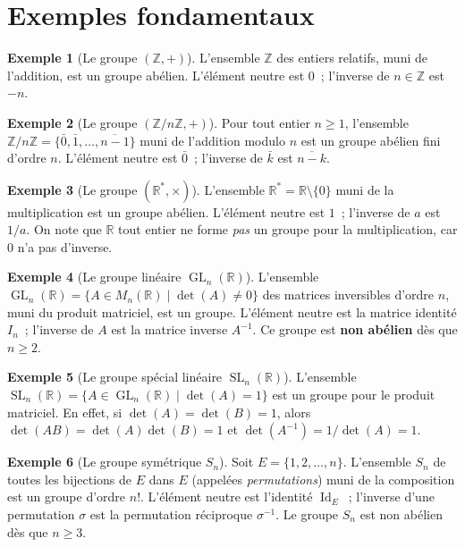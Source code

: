 \documentclass[12pt,a4paper,openany]{book}
\theoremstyle{definition}
\newtheorem{exemple}{Exemple}[chapter]
\newcommand{\Z}{\mathbb{Z}}
\newcommand{\R}{\mathbb{R}}
\DeclareMathOperator{\Id}{Id}
\DeclareMathOperator{\GL}{GL}
\DeclareMathOperator{\SL}{SL}
\begin{document}
\section{Exemples fondamentaux}
\label{sec:ch1-exemples}

\begin{exemple}[Le groupe $(\Z, +)$]
\label{ex:Z-additif}
\index{Z@$\Z$}
L'ensemble $\Z$ des entiers relatifs, muni de l'addition, est un groupe abélien.
L'élément neutre est $0$~; l'inverse de $n \in \Z$ est $-n$.
\end{exemple}

\begin{exemple}[Le groupe $(\Z/n\Z, +)$]
\label{ex:ZnZ-additif}
\index{Z/nZ@$\Z/n\Z$}
Pour tout entier $n \geq 1$, l'ensemble $\Z/n\Z = \{\bar{0}, \bar{1}, \ldots,
\overline{n-1}\}$ muni de l'addition modulo $n$ est un groupe abélien fini d'ordre $n$.
L'élément neutre est $\bar{0}$~; l'inverse de $\bar{k}$ est $\overline{n-k}$.
\end{exemple}

\begin{exemple}[Le groupe $(\R^*, \times)$]
\label{ex:R-etoile}
\index{R*@$\R^*$}
L'ensemble $\R^* = \R \setminus \{0\}$ muni de la multiplication est un groupe abélien.
L'élément neutre est $1$~; l'inverse de $a$ est $1/a$. On note que $\R$ tout entier ne
forme \emph{pas} un groupe pour la multiplication, car $0$ n'a pas d'inverse.
\end{exemple}

\begin{exemple}[Le groupe linéaire $\GL_n(\R)$]
\label{ex:GLn}
\index{GL@$\GL_n$}
L'ensemble $\GL_n(\R) = \{ A \in M_n(\R) \mid \det(A) \neq 0 \}$ des matrices
inversibles d'ordre $n$, muni du produit matriciel, est un groupe. L'élément neutre est
la matrice identité $I_n$~; l'inverse de $A$ est la matrice inverse $A^{-1}$. Ce groupe
est \textbf{non abélien} dès que $n \geq 2$.
\end{exemple}

\begin{exemple}[Le groupe spécial linéaire $\SL_n(\R)$]
\label{ex:SLn}
\index{SL@$\SL_n$}
L'ensemble $\SL_n(\R) = \{ A \in \GL_n(\R) \mid \det(A) = 1 \}$ est un groupe pour le
produit matriciel. En effet, si $\det(A) = \det(B) = 1$, alors $\det(AB) =
\det(A)\det(B) = 1$ et $\det(A^{-1}) = 1/\det(A) = 1$.
\end{exemple}

\begin{exemple}[Le groupe symétrique $S_n$]
\label{ex:Sn}
Soit $E = \{1, 2, \ldots, n\}$. L'ensemble $S_n$ de toutes les bijections de $E$ dans
$E$ (appelées \emph{permutations}) muni de la composition est un
groupe d'ordre $n!$. L'élément neutre est l'identité $\Id_E$~; l'inverse d'une
permutation $\sigma$ est la permutation réciproque $\sigma^{-1}$. Le groupe $S_n$ est
non abélien dès que $n \geq 3$.
\end{exemple}
\end{document}
